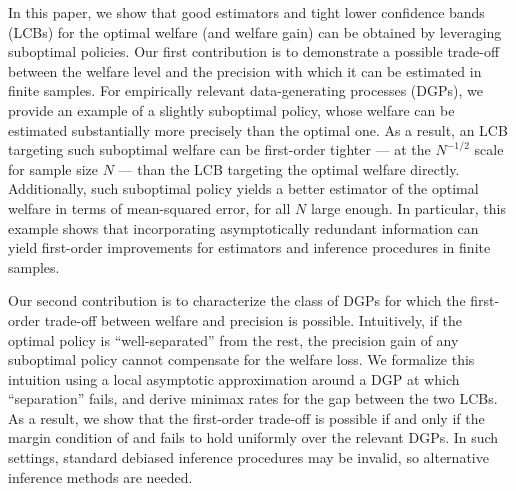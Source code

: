 \documentclass[12pt]{article}
\numberwithin{equation}{section}
\theoremstyle{plain}                         %
\theoremstyle{definition}                  %
\theoremstyle{remark}                      %
\begin{document}
In this paper, we show that good estimators and tight lower confidence bands (LCBs) for the optimal welfare (and welfare gain) can be obtained by leveraging suboptimal policies. Our first contribution is to demonstrate a possible trade-off between the welfare level and the precision with which it can be estimated in finite samples. For empirically relevant data-generating processes (DGPs), we provide an example of a slightly suboptimal policy, whose welfare can be estimated substantially more precisely than the optimal one. As a result, an LCB targeting such suboptimal welfare can be first-order tighter --- at the $N^{-1/2}$ scale for sample size $N$ --- than the LCB targeting the optimal welfare directly. Additionally, such suboptimal policy yields a better estimator of the optimal welfare in terms of mean-squared error, for all $N$ large enough. In particular, this example shows that incorporating asymptotically redundant information can yield first-order improvements for estimators and inference procedures in finite samples. 


Our second contribution is to characterize the class of DGPs for which the first-order trade-off between welfare and precision is possible. Intuitively, if the optimal policy is ``well-separated'' from the rest, the precision gain of any suboptimal policy cannot compensate for the welfare loss. We formalize this intuition using a local asymptotic approximation around a DGP at which ``separation'' fails, and derive minimax rates for the gap between the two LCBs. As a result, we show that the first-order trade-off is possible if and only if the margin condition of \citet{MammenTsybakov} and \citet{Tsybakov} fails to hold uniformly over the relevant DGPs. In such settings, standard debiased inference procedures may be invalid, so alternative inference methods are needed.


\end{document}
